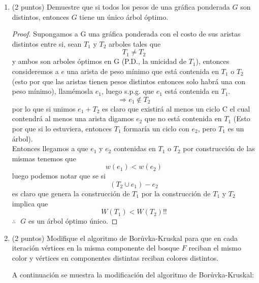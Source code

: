 \documentclass{article}
\begin{document}
\begin{enumerate}
\begin{proof}
    
  \end{proof}

  
\item (2 puntos) Demuestre que si todos los pesos de una gr\'afica
  ponderada $G$ son distintos, entonces $G$ tiene un \'unico \'arbol
  \'optimo.

  \begin{proof}
    Supongamos a G una gráfica ponderada con el costo de sus aristas
    distintos entre si, sean $T_1$ y $T_2$ arboles tales que 
    \[
    T_1 \neq  T_2 
    \]
    y ambos son arboles óptimos en G (P.D., la unicidad de $T_1$),
    entonces consideremos a $e$ una arista de peso mínimo que está
    contenida en  $T_1$ o $T_2$ (esto por que las aristas tienen
    pesos distintos entonces solo habrá una con peso mínimo),
    llamémosla $e_1$, luego s.p.g. que $e_1$ está contenida en $T_1$.
    \[
    \Rightarrow e_1 \notin T_2
    \]
    por lo que si unimos  $e_1 + T_2$ es claro que existirá al menos
    un ciclo C el cual contendrá al menos una arista digamos $e_2$
    que no está contenida en $T_1$ (Esto por que si lo estuviera,
    entonces $T_1$ formaría un ciclo con $e_2$, pero  $T_1$ es un árbol).\\
    Entonces llegamos a que $e_1$ y $e_2$ contenidas en $T_1$ o $T_2$ por
    construcción de las mismas tenemos que 
    \[
    w(e_1) < w(e_2)
    \]
    luego podemos notar que se si
    \[
    (T_2 \cup e_1) - e_2
    \]
    es claro que genera la construcción de $T_1$   por la construcción
    de  $T_1$  y $T_2$  implica que 
    \[
    W(T_1) < W(T_2)!!
    \]
    \hspace*{4cm} $\therefore\ \ \  G$ es un árbol óptimo único.
  \end{proof}


\item (2 puntos) Modifique el algoritmo de Bor\r uvka-Kruskal para que en cada
  iteraci\'on v\'ertices en la misma componente del bosque $F$ reciban el
  mismo color y v\'ertices en componentes distintas reciban colores distintos.
  
  A continuación se muestra la modificación del algoritmo de Bor\r uvka-Kruskal:
  

\end{enumerate}
\end{document}
